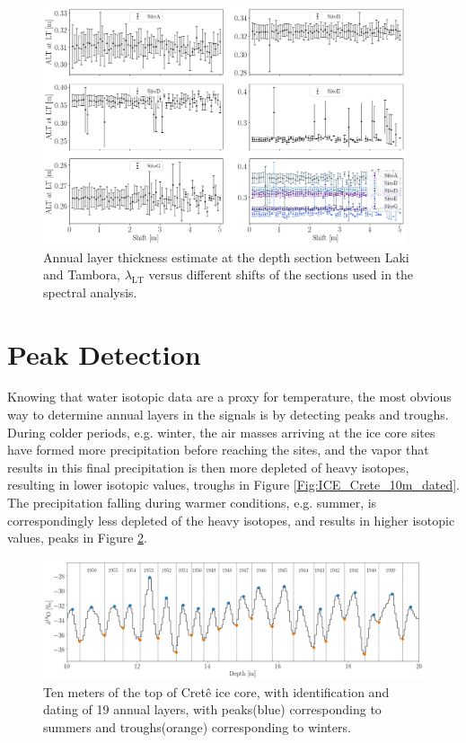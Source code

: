 \documentclass[../../CompleteThesis2/Complete_2ndDraft]{subfiles}
\begin{document}
\begin{figure}[h]
	\centering
	\includegraphics[width=0.95\textwidth]{AllCores_ALTvsShift.png}
	\caption[$\lambda_{\text{LT}}0$ vs. $s_{\text{sec}}$]{\small Annual layer thickness estimate at the depth section between Laki and Tambora, $\lambda_{\text{LT}}$ versus different shifts of the sections used in the spectral analysis.}
	\label{fig:AllCores_ALTvsShift}
\end{figure}




\section[Peak Detection]{Peak Detection}
\label{Sec:CompMeths_PeakDetection}

Knowing that water isotopic data are a proxy for temperature, the most obvious way to determine annual layers in the signals is by detecting peaks and troughs. During colder periods, e.g. winter, the air masses arriving at the ice core sites have formed more precipitation before reaching the sites, and the vapor that results in this final precipitation is then more depleted of heavy isotopes, resulting in lower isotopic values, troughs in Figure \ref{Fig:ICE_Crete_10m_dated}. The precipitation falling during warmer conditions, e.g. summer, is correspondingly less depleted of the heavy isotopes, and results in higher isotopic values, peaks in Figure \ref{Fig:COMPMETH_Crete_10m_PeaksTroughs}.
\begin{figure}[h]
	\centering
	\includegraphics[width=\textwidth]{Crete_10m_PeaksTroughs.png}
	\caption[10 m of Crête core with peaks and troughs.]{\small Ten meters of the top of Cretê ice core, with identification and dating of 19 annual layers, with peaks(blue) corresponding to summers and troughs(orange) corresponding to winters.}
	\label{Fig:COMPMETH_Crete_10m_PeaksTroughs}
\end{figure}
\end{document}
